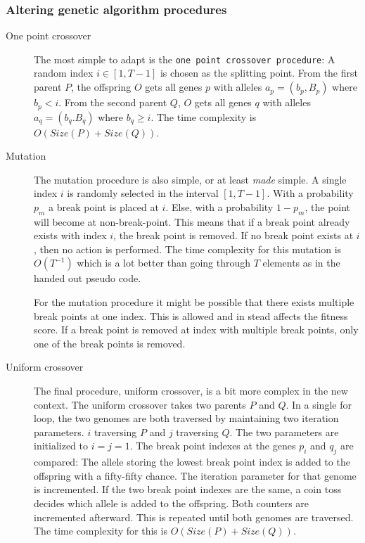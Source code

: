 \subsubsection{Altering genetic algorithm procedures}
\label{sec:altering-procedures}

\begin{description}
    \item[One point crossover] The most simple to adapt is the \texttt{one point
    crossover procedure}: A random index $i \in [1, T-1]$ is chosen as the
    splitting point. From the first parent $P$, the offspring $O$ gets all genes
    $p$ with alleles $a_p = (b_p, B_p)$ where $b_p < i$. From the second parent
    $Q$, $O$ gets all genes $q$ with alleles $a_q = (b_q. B_q)$ where $b_q \geq
    i$. The time complexity is $O(Size(P) + Size(Q))$.
    
    
    \item [Mutation] The mutation procedure is also simple, or at least
    \textit{made} simple. A single index $i$ is randomly selected in the
    interval $[1, T - 1]$. With a probability $p_m$ a break point is placed at
    $i$. Else, with a probability $1 - p_m$, the point will become at
    non-break-point. This means that if a break point already exists with index
    $i$, the break point is removed. If no break point exists at $i$, then no
    action is performed. The time complexity for this mutation is $O(T^{-1})$
    which is a lot better than going through $T$ elements as in the handed out
    pseudo code. 
    
    For the mutation procedure it might be possible that there exists multiple
    break points at one index. This is allowed and in stead affects the fitness
    score. If a break point is removed at index with multiple break points, only
    one of the break points is removed. 
    

    \item [Uniform crossover] The final procedure, uniform crossover, is a bit
    more complex in the new context. The uniform crossover takes two parents $P$
    and $Q$. In a single for loop, the two genomes are both traversed by
    maintaining two iteration parameters. $i$ traversing $P$ and $j$ traversing
    $Q$. The two parameters are initialized to $i = j = 1$. The break point
    indexes at the genes $p_i$ and $q_j$ are compared: The allele storing the
    lowest break point index is added to the offspring with a fifty-fifty
    chance. The iteration parameter for that genome is incremented. If the two
    break point indexes are the same, a coin toss decides which allele is added
    to the offspring. Both counters are incremented afterward. This is repeated
    until both genomes are traversed. The time complexity for this is $O(Size(P)
    + Size(Q))$. 
    

\end{description}
